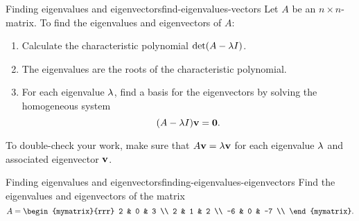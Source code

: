 \begin{procedure}{Finding eigenvalues and eigenvectors}{find-eigenvalues-vectors}
  Let $A$ be an $n\times n$-matrix. To find the eigenvalues and
  eigenvectors of $A$:
  \begin{enumerate}
  \item Calculate the characteristic polynomial $\det(A-\lambda I)$.
  \item The eigenvalues are the roots of the characteristic polynomial.
  \item For each eigenvalue $\lambda$, find a basis for the
    eigenvectors by solving the homogeneous system
    \begin{equation*}
      (A-\lambda I)\mbox{\bf v} = \mbox{\bf 0}.
    \end{equation*}
  \end{enumerate}
  To double-check your work, make sure that $A\mbox{\bf v}=\lambda\mbox{\bf v}$
  for each eigenvalue $\lambda$ and associated eigenvector $\mbox{\bf v}$.
\end{procedure}

\begin{example}{Finding eigenvalues and eigenvectors}{finding-eigenvalues-eigenvectors}
  Find the eigenvalues and eigenvectors of the matrix
  \begin{equation}
    A = \begin{mymatrix}{rrr}
      2  & 0 & 3 \\
      2  & 1 & 2 \\
      -6 & 0 & -7 \\
    \end{mymatrix}.
  \end{equation}
\end{example}

